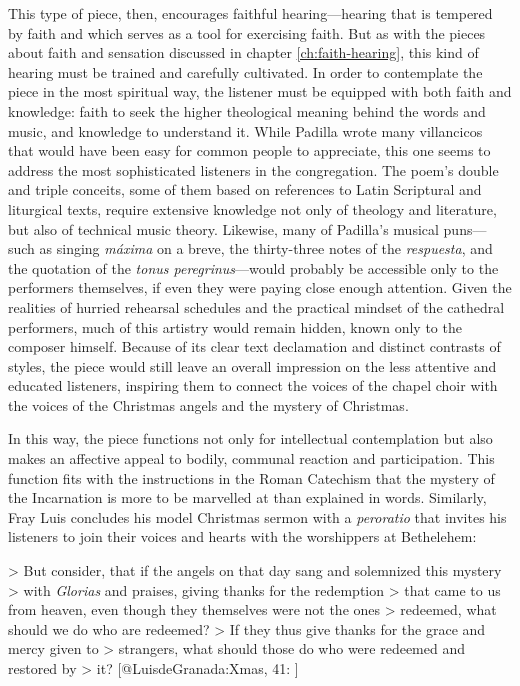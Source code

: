 This type of piece, then, encourages faithful hearing---hearing that is tempered
by faith and which serves as a tool for exercising faith.
But as with the pieces about faith and sensation discussed in chapter
\ref{ch:faith-hearing}, this kind of hearing must be trained and carefully
cultivated. 
In order to contemplate the piece in the most spiritual way, the listener must
be equipped with both faith and knowledge: faith to seek the higher theological
meaning behind the words and music, and knowledge to understand it.
While Padilla wrote many villancicos that would have been easy for common people
to appreciate, this one seems to address the most sophisticated listeners in the
congregation.
The poem's double and triple conceits, some of them based on references to Latin
Scriptural and liturgical texts, require extensive knowledge not only of
theology and literature, but also of technical music theory.
Likewise, many of Padilla's musical puns---such as singing \emph{máxima} on a breve,
the thirty-three notes of the \emph{respuesta}, and the quotation of the \emph{tonus
peregrinus}---would probably be accessible only to the performers themselves, if
even they were paying close enough attention.
Given the realities of hurried rehearsal schedules and the practical mindset of
the cathedral performers, much of this artistry would remain hidden, known
only to the composer himself.
Because of its clear text declamation and distinct contrasts of styles, the
piece would still leave an overall impression on the less attentive and educated
listeners, inspiring them to connect the voices of the chapel choir with the
voices of the Christmas angels and the mystery of Christmas.

In this way, the piece functions not only for intellectual contemplation but
also makes an affective appeal to bodily, communal reaction and participation.
This function fits with the instructions in the Roman Catechism that the mystery
of the Incarnation is more to be marvelled at than explained in words.
Similarly, Fray Luis concludes his model Christmas sermon with a \emph{peroratio}
that invites his listeners to join their voices and hearts with the worshippers
at Bethelehem:

> But consider, that if the angels on that day sang and solemnized this mystery
> with \emph{Glorias} and praises, giving thanks  for the redemption
> that came to us from heaven, even though they themselves were not the ones
> redeemed, what should we do who are redeemed?
> If they thus give thanks for the grace  and mercy given to
> strangers, what should those do who were redeemed and restored by
> it?
[@LuisdeGranada:Xmas, 41:
]

